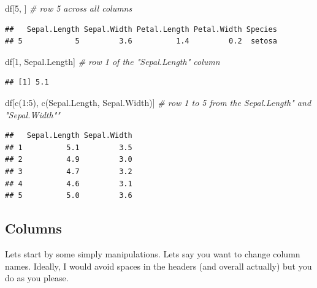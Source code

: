 \documentclass[
]{book}
\newenvironment{Shaded}{\begin{snugshade}}{\end{snugshade}}
\newcommand{\CommentTok}[1]{\textcolor[rgb]{0.56,0.35,0.01}{\textit{#1}}}
\newcommand{\DecValTok}[1]{\textcolor[rgb]{0.00,0.00,0.81}{#1}}
\newcommand{\FunctionTok}[1]{\textcolor[rgb]{0.00,0.00,0.00}{#1}}
\newcommand{\NormalTok}[1]{#1}
\newcommand{\SpecialCharTok}[1]{\textcolor[rgb]{0.00,0.00,0.00}{#1}}
\newcommand{\StringTok}[1]{\textcolor[rgb]{0.31,0.60,0.02}{#1}}
\begin{document}
\begin{Shaded}
\begin{Highlighting}[]
\NormalTok{df[}\DecValTok{5}\NormalTok{, ]   }\CommentTok{\# row 5 across all columns}
\end{Highlighting}
\end{Shaded}

\begin{verbatim}
##   Sepal.Length Sepal.Width Petal.Length Petal.Width Species
## 5            5         3.6          1.4         0.2  setosa
\end{verbatim}

\begin{Shaded}
\begin{Highlighting}[]
\NormalTok{df[}\DecValTok{1}\NormalTok{, }\StringTok{\textquotesingle{}Sepal.Length\textquotesingle{}}\NormalTok{]  }\CommentTok{\# row 1 of the "Sepal.Length" column}
\end{Highlighting}
\end{Shaded}

\begin{verbatim}
## [1] 5.1
\end{verbatim}

\begin{Shaded}
\begin{Highlighting}[]
\NormalTok{df[}\FunctionTok{c}\NormalTok{(}\DecValTok{1}\SpecialCharTok{:}\DecValTok{5}\NormalTok{), }\FunctionTok{c}\NormalTok{(}\StringTok{\textquotesingle{}Sepal.Length\textquotesingle{}}\NormalTok{, }\StringTok{\textquotesingle{}Sepal.Width\textquotesingle{}}\NormalTok{)]  }\CommentTok{\# row 1 to 5 from the Sepal.Length" and "Sepal.Width""}
\end{Highlighting}
\end{Shaded}

\begin{verbatim}
##   Sepal.Length Sepal.Width
## 1          5.1         3.5
## 2          4.9         3.0
## 3          4.7         3.2
## 4          4.6         3.1
## 5          5.0         3.6
\end{verbatim}

\hypertarget{columns}{%
\subsection{Columns}\label{columns}}

Lets start by some simply manipulations.
Lets say you want to change column names.
Ideally, I would avoid spaces in the headers (and overall actually) but you do as you please.
\end{document}
